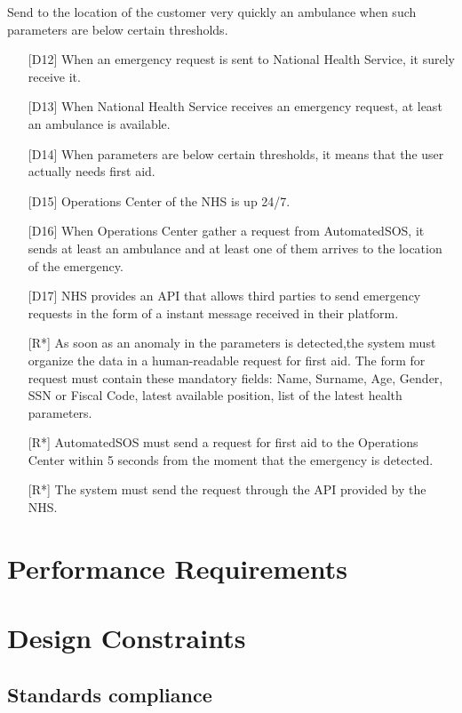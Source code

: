 \begin{enumerate} [resume, label={[G\arabic*]}]
    \item Send to the location of the customer very quickly an ambulance when such parameters are below certain thresholds. 
        \begin{itemize}
            \item [{[D12]}] When an emergency request is sent to National Health Service, it surely receive it.
            \item [{[D13]}] When National Health Service receives an emergency request, at least an ambulance is available.
            \item [{[D14]}] When  parameters  are  below  certain  thresholds,  it  means  that  the  user actually needs first aid.
            \item [{[D15]}] Operations Center of the NHS is up 24/7.
            \item [{[D16]}] When Operations Center gather a request from AutomatedSOS, it sends at least an ambulance and at least one of them arrives to the location of the emergency.
            \item [{[D17]}] NHS provides an API that allows third parties to send emergency requests in the form of a instant message received in their platform.
            \item [{[R*]}] As soon as an anomaly in the parameters is detected,the system must organize the data in a human-readable request for first aid. The form for request must contain these mandatory fields: Name, Surname, Age, Gender, SSN or Fiscal Code, latest available position, list of the latest health parameters.
            \item [{[R*]}] AutomatedSOS must send a request for first aid to the Operations Center within 5 seconds from the moment that the emergency is detected.
            \item [{[R*]}] The system must send the request through the API provided by the NHS.
        \end{itemize}
\end{enumerate}


\section{Performance Requirements}

\section{Design Constraints}
\subsection{Standards compliance}
